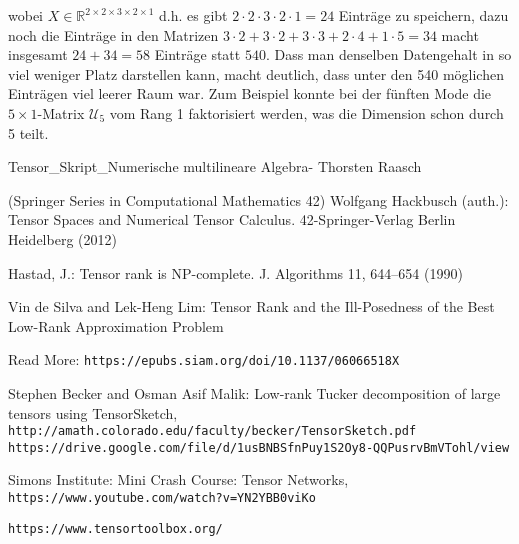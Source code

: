 \documentclass[11pt]{article} %
\begin{document}
\begin{changemargin}{0pt}{0pt}
wobei $X \in \mathbb{R}^{2\times 2\times 3\times 2\times 1}$ d.h. es gibt $2\cdot 2\cdot 3\cdot 2\cdot 1 = 24$ Einträge zu speichern,
dazu noch die Einträge in den Matrizen $3\cdot2 + 3\cdot2 + 3\cdot3 + 2\cdot4 +1\cdot5 = 34$ macht insgesamt $24+34=58$ Einträge
statt $540$. Dass man denselben Datengehalt in so viel weniger Platz darstellen kann, macht deutlich, dass unter den 
540 möglichen Einträgen viel leerer Raum war. Zum Beispiel konnte bei der fünften Mode die $5 \times 1$-Matrix 
$\mathcal{U}_{5}$ vom Rang 1 faktorisiert werden, was die Dimension schon durch 5 teilt.


\end{changemargin}

\newpage

\begin{thebibliography}{9}
Tensor\_Skript\_Numerische multilineare Algebra- Thorsten Raasch

(Springer Series in Computational Mathematics 42) Wolfgang Hackbusch (auth.):
Tensor Spaces and Numerical Tensor Calculus. 42-Springer-Verlag Berlin Heidelberg (2012)

Hastad, J.: Tensor rank is NP-complete. J. Algorithms 11, 644–654 (1990)

Vin de Silva and Lek-Heng Lim:
Tensor Rank and the Ill-Posedness of the Best Low-Rank Approximation Problem

Read More: \texttt{https://epubs.siam.org/doi/10.1137/06066518X}

Stephen Becker and  Osman Asif Malik: Low-rank Tucker decomposition of large tensors using
TensorSketch,
\\\texttt{http://amath.colorado.edu/faculty/becker/TensorSketch.pdf}
\\\texttt{https://drive.google.com/file/d/1usBNBSfnPuy1S2Oy8-QQPusrvBmVTohl/view}

Simons Institute: Mini Crash Course: Tensor Networks,
\\\texttt{https://www.youtube.com/watch?v=YN2YBB0viKo}

\texttt{https://www.tensortoolbox.org/}

\end{thebibliography}
\end{document}
